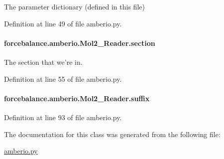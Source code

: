 The parameter dictionary (defined in this file) 



Definition at line 49 of file amberio.\-py.

\hypertarget{classforcebalance_1_1amberio_1_1Mol2__Reader_a748ad6976c24a436086c3fdfc5716a3b}{
\paragraph[{section}]{\setlength{\rightskip}{0pt plus 5cm}forcebalance.\-amberio.\-Mol2\-\_\-\-Reader.\-section}}\label{classforcebalance_1_1amberio_1_1Mol2__Reader_a748ad6976c24a436086c3fdfc5716a3b}


The section that we're in. 



Definition at line 55 of file amberio.\-py.

\hypertarget{classforcebalance_1_1amberio_1_1Mol2__Reader_af8d28632564eca23e96ed3fe4000a985}{
\paragraph[{suffix}]{\setlength{\rightskip}{0pt plus 5cm}forcebalance.\-amberio.\-Mol2\-\_\-\-Reader.\-suffix}}\label{classforcebalance_1_1amberio_1_1Mol2__Reader_af8d28632564eca23e96ed3fe4000a985}


Definition at line 93 of file amberio.\-py.



The documentation for this class was generated from the following file\-:\begin{DoxyCompactItemize}
\item 
\hyperlink{amberio_8py}{amberio.\-py}\end{DoxyCompactItemize}
